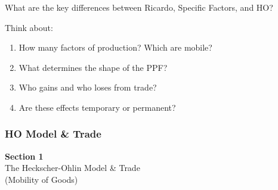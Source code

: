 \documentclass{beamer}
\begin{document}
\begin{frame}{What are the key differences between Ricardo, Specific Factors, and HO?}

\vspace{0.3cm}

Think about:
\begin{enumerate}
    \item How many factors of production? Which are mobile?
    \item What determines the shape of the PPF?
    \item Who gains and who loses from trade?
    \item Are these effects temporary or permanent?
\end{enumerate}

\end{frame}


\subsubsection{HO Model \& Trade}
\begin{frame}

\vspace{2cm}

\centering
{\LARGE \textbf{Section 1}} \\[0.5cm]
{\Large The Heckscher-Ohlin Model \& Trade} \\[0.3cm]
{\large (Mobility of Goods)}

\vfill

\end{frame}
\end{document}
